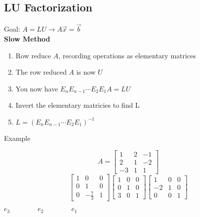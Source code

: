 \documentclass[10pt]{article}
\begin{document}
\pagebreak

\begin{multicols}{2}
    \begin{minipage}{\columnwidth}
        \subsection*{LU Factorization}
        Goal: \(A = LU \rightarrow A\overrightarrow{x} = \overrightarrow{b} \) \\
        \textbf{Slow Method}
        \begin{enumerate}
            \item Row reduce \(A\), recording operations as elementary matrices
            \item The row reduced \(A\) is now \(U\)
            \item You now have \(E_n E_{n-1} \cdots E_2 E_1 A = LU\)
            \item Invert the elementary matricies to find L
            \item \(L = (E_n E_{n-1} \cdots E_2 E_1) ^ {-1}\)
        \end{enumerate}

        Example
        \begin{minipage}{0.5\linewidth}
            \[
                A = \begin{bmatrix}
                    1  & 2 & -1 \\
                    2  & 1 & -2 \\
                    -3 & 1 & 1
                \end{bmatrix}
            \]
            \[
                \begin{bmatrix}
                    1 & 0            & 0 \\
                    0 & 1            & 0 \\
                    0 & -\frac{7}{3} & 1
                \end{bmatrix}
                \begin{bmatrix}
                    1 & 0 & 0 \\
                    0 & 1 & 0 \\
                    3 & 0 & 1
                \end{bmatrix}
                \begin{bmatrix}
                    1  & 0 & 0 \\
                    -2 & 1 & 0 \\
                    0  & 0 & 1
                \end{bmatrix}
            \]
            \begin{center}
                \(e_3 \quad\quad\quad\quad e_2 \quad\quad\quad\quad e_1\)
            \end{center}


\end{minipage}
\end{minipage}
\end{multicols}
\end{document}
